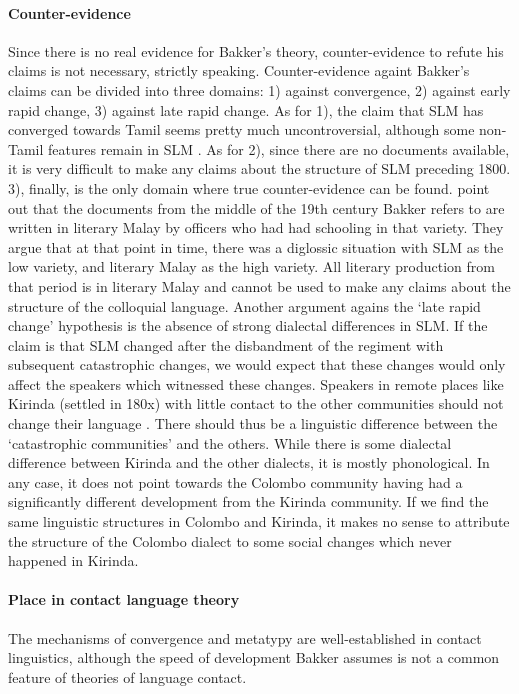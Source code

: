 \paragraph{Counter-evidence}
Since there is no real evidence for Bakker's theory, counter-evidence to refute his claims is not necessary, strictly speaking. Counter-evidence againt Bakker's claims can be divided into three domains: 1) against convergence, 2) against early rapid change, 3) against late rapid change. As for 1), the claim that SLM has converged towards Tamil seems pretty much uncontroversial, although some non-Tamil features remain in SLM \citep{Slomanson2007cll}. As for 2), since there are no documents available, it is very difficult to make any claims about the structure of SLM preceding 1800. 3), finally, is the only domain where true counter-evidence can be found. \citet{SmithEtAl2007} point out that the documents from the middle of the 19th century Bakker refers to are written in literary Malay by officers who had had schooling in that variety. They argue that at that point in time, there was a diglossic situation with SLM as the low variety, and literary Malay as the high variety. All literary production from that period is in literary Malay and cannot be used to make any claims about the structure of the colloquial language. Another argument agains the `late rapid change' hypothesis is the absence of strong dialectal differences in SLM.
If the claim is that SLM changed after the disbandment of the regiment with subsequent catastrophic changes, we would expect that these changes would only affect the speakers which witnessed these changes. Speakers in remote places like Kirinda (settled in 180x\kuckn) with little contact to the other communities should not change their language \citep[cf.][]{SmithRH}. There should thus be a linguistic difference between the `catastrophic communities' and the others. While there is some dialectal difference between Kirinda and the other dialects, it is mostly phonological. In any case, it does not point towards the Colombo community having had a significantly different development from the Kirinda community. If we find the same linguistic structures in Colombo and Kirinda, it makes no sense to attribute the structure of the Colombo dialect to some social changes which never happened in Kirinda.
 
\paragraph{Place in contact language theory}
The mechanisms of convergence and metatypy are well-established in contact linguistics, although the speed of development Bakker assumes is not a common feature of theories of language contact.

